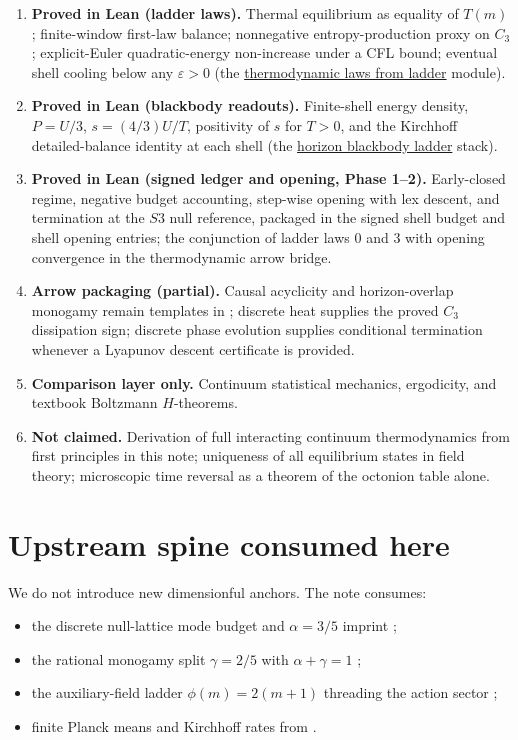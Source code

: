 \documentclass[11pt]{amsart}
\begin{document}
\begin{enumerate}[leftmargin=2em]
\item \textbf{Proved in Lean (ladder laws).}
  Thermal equilibrium as equality of $T(m)$; finite-window first-law balance;
  nonnegative entropy-production proxy on $C_3$; explicit-Euler quadratic-energy
  non-increase under a CFL bound; eventual shell cooling below any $\varepsilon>0$
  (the \hyperref[lean:thermo-laws]{thermodynamic laws from ladder} module).
\item \textbf{Proved in Lean (blackbody readouts).}
  Finite-shell energy density, $P=U/3$, $s=(4/3)U/T$, positivity of $s$ for $T>0$,
  and the Kirchhoff detailed-balance identity at each shell
  (the \hyperref[lean:blackbody-ladder]{horizon blackbody ladder} stack).
\item \textbf{Proved in Lean (signed ledger and opening, Phase 1--2).}
  Early-closed regime, negative budget accounting, step-wise opening with lex descent,
  and termination at the $S3$ null reference, packaged in the signed shell budget and
  shell opening entries; the conjunction of ladder laws 0 and 3 with opening convergence
  in the thermodynamic arrow bridge.
\item \textbf{Arrow packaging (partial).}
  Causal acyclicity and horizon-overlap monogamy remain templates in
  \cite{hqiv-3d-growth-paper}; discrete heat supplies the proved $C_3$ dissipation sign;
  discrete phase evolution supplies conditional termination whenever a Lyapunov
  descent certificate is provided.
\item \textbf{Comparison layer only.}
  Continuum statistical mechanics, ergodicity, and textbook Boltzmann $H$-theorems.
\item \textbf{Not claimed.}
  Derivation of full interacting continuum thermodynamics from first principles in this
  note; uniqueness of all equilibrium states in field theory; microscopic time reversal
  as a theorem of the octonion table alone.
\end{enumerate}

\section{Upstream spine consumed here}
\label{sec:upstream}

We do not introduce new dimensionful anchors. The note consumes:

\begin{itemize}[leftmargin=2em]
\item the discrete null-lattice mode budget and $\alpha=3/5$ imprint
  \cite{hqiv-lightcone-paper,hqiv-kirchhoff-paper};
\item the rational monogamy split $\gamma=2/5$ with $\alpha+\gamma=1$
  \cite{hqiv-3d-growth-paper,hqiv-oct-action-paper};
\item the auxiliary-field ladder $\phi(m)=2(m+1)$ threading the action sector
  \cite{hqiv-oct-action-paper};
\item finite Planck means and Kirchhoff rates from
  \cite{hqiv-kirchhoff-paper}.
\end{itemize}
\end{document}
